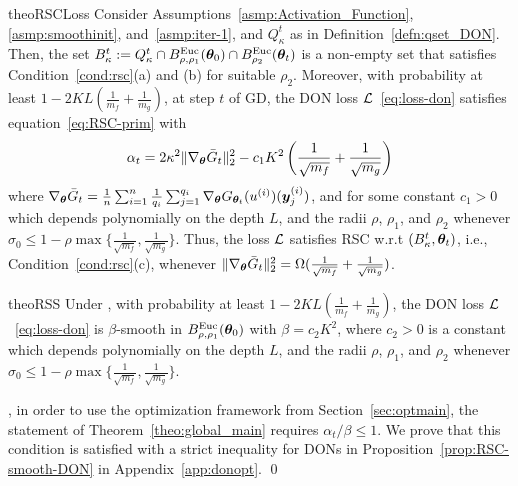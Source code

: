 \begin{restatable}{theo}{RSCLoss}
Consider Assumptions~\ref{asmp:Activation_Function}, \ref{asmp:smoothinit}, and~\ref{asmp:iter-1}, and $Q^t_{\kappa}$ as in Definition~\ref{defn:qset_DON}.
Then, the set $B^t_{\kappa} := Q_{\kappa}^t \cap B^{\mathrm{Euc}}_{\rho,\rho_1}({\bm{\theta}}_0) \cap B^{\mathrm{Euc}}_{\rho_2}({\bm{\theta}}_t)$ is a non-empty set that satisfies Condition~\ref{cond:rsc}(a) and (b) for suitable $\rho_2$. 
Moreover, 
with probability at least {$1-2KL(\frac{1}{m_f}+\frac{1}{m_g})$}, at step $t$ of GD, %
the DON loss ${\mathcal{L}}$~\eqref{eq:loss-don} satisfies
equation~\eqref{eq:RSC-prim} with
\begin{equation}
\alpha_t = 2\kappa^2 \| \nabla_{{\bm{\theta}}} \bar{G}_t \|_2^2 - 
    c_1K^2\left(\frac{1}{\sqrt{m_f}}+\frac{1}{\sqrt{m_g}}\right)
        \label{eq:RSCLoss}
\end{equation}
where $\nabla_{{\bm{\theta}}}\bar{G}_t = \frac{1}{n} \sum_{i=1}^n \frac{1}{q_i}  \sum_{j=1}^{q_i} \nabla_{{\bm{\theta}}}G_{{\bm{\theta}}_t}(u^{(i)})({\bm{y}}^{(i)}_j)$, 
and for some constant $c_1 >0$ 
%
which depends polynomially on the depth $L$, and the radii $\rho$, $\rho_1$, and $\rho_2$ whenever $\sigma_0\leq 1-\rho\max\{\frac{1}{\sqrt{m_f}},\frac{1}{\sqrt{m_g}}\}$.
Thus, the loss ${\mathcal{L}}$ satisfies RSC w.r.t $(B_{\kappa}^t, {\bm{\theta}}_t)$, i.e., Condition~\ref{cond:rsc}(c), whenever $\| \nabla_{{\bm{\theta}}} \bar{G}_t \|_2^2 = \Omega(\frac{1}{\sqrt{m_f}}+\frac{1}{\sqrt{m_g}})$.
\label{theo:rsc_main_DON}
\end{restatable}
%

\begin{restatable}{theo}{RSS}
Under , with probability at least {$1-2KL(\frac{1}{m_f}+\frac{1}{m_g})$}, the DON loss ${\cal L}$~\eqref{eq:loss-don} is $\beta$-smooth in $B^{\mathrm{Euc}}_{\rho,\rho_1}({\bm{\theta}}_0)$ with $\beta =c_2K^2$, where 
%
$c_2>0$ is a constant which depends polynomially on the depth $L$, and the radii $\rho$, $\rho_1$, and $\rho_2$ whenever $\sigma_0\leq 1-\rho\max\{\frac{1}{\sqrt{m_f}},\frac{1}{\sqrt{m_g}}\}$.
%
\label{theo:smooth_main}
\end{restatable}
%

\begin{remark} 
\label{rem:abeta-DON}
, in order to use the optimization framework from Section~\ref{sec:optmain}, the statement of Theorem~\ref{theo:global_main} requires 
$\alpha_t/\beta\leq 1$. We prove that this condition is satisfied with a strict inequality for DONs in Proposition~\ref{prop:RSC-smooth-DON} in Appendix~\ref{app:donopt}. 
\qed
\end{remark}

